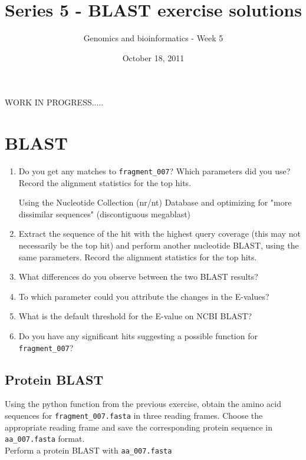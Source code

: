 \documentclass[a4paper,11pt]{article}
\title{Series 5 - BLAST exercise solutions}
\date{October 18, 2011}
\author{Genomics and bioinformatics - Week 5}
\begin{document}
\maketitle

WORK IN PROGRESS..... 

\section{BLAST}

\begin{enumerate}
\item Do you get any matches to \texttt{fragment\_007}? Which parameters did you use? Record the alignment statistics for the top hits.

Using the Nucleotide Collection (nr/nt) Database and optimizing for "more dissimilar sequences"
(discontiguous megablast)

\item Extract the sequence of the hit with the highest query coverage (this may not necessarily be the top hit) and perform another nucleotide BLAST, using the same parameters. Record the alignment statistics for the top hits.

\item What differences do you observe between the two BLAST results?

\item To which parameter could you attribute the changes in the E-values?  

\item What is the default threshold for the E-value on NCBI BLAST?

\item Do you have any significant hits suggesting a possible function for \texttt{fragment\_007}? 
\end{enumerate}

\subsection{Protein BLAST}

Using the python function from the previous exercise, obtain the amino acid sequences for \texttt{fragment\_007.fasta} in three reading frames. Choose the appropriate reading frame and save the corresponding protein sequence in \texttt{aa\_007.fasta} format.\\

Perform a protein BLAST with \texttt{aa\_007.fasta} 
\end{document}
